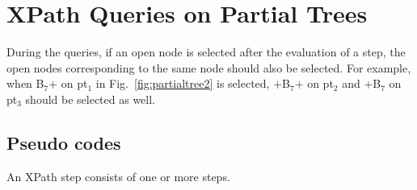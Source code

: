 \section{XPath Queries on Partial Trees}


During the queries, if an open node is selected after the evaluation of a step, 
the open nodes corresponding to the same node should also be selected. 
For example, when B$_7$+ on pt$_1$ in Fig.~\ref{fig:partialtree2} is selected, 
+B$_7$+ on pt$_2$ and +B$_7$ on pt$_3$ should be selected as well.

\subsection{Pseudo codes}

An XPath step consists of one or more steps. 

